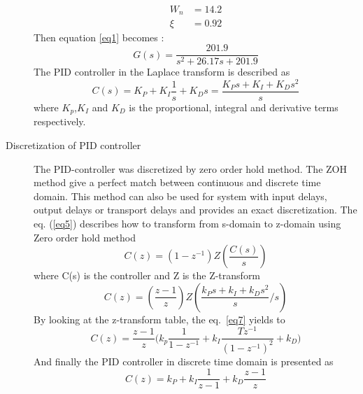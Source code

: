 \begin{description}
\begin{equation}
\begin{split}
     W_n & = 14.2 \\
    \xi & = 0.92
\end{split}
\end{equation}
Then equation \ref{eq1} becomes :
\begin{equation}
    G(s)=\frac{201.9}{s^2+26.17s+201.9}
\end{equation}
The PID controller in the Laplace transform is described as
    \begin{equation}
    C(s)= K_P+K_I \frac{1}{s}+K_Ds= \frac{K_Ps+K_I+K_Ds^2}{s}
\end{equation}
where $K_p$,$K_I$ and $K_D$ is the proportional, integral and derivative terms respectively.
\item[Discretization of PID controller]
The PID-controller was discretized by zero order hold method. The ZOH method give a perfect match between continuous and discrete time domain. This method can also be used for system with input delays, output delays or transport delays and provides an exact discretization.
The eq. (\ref{eq5}) describes how to transform from s-domain to z-domain using Zero order hold method
\begin{equation} \label{eq5}
    C(z)=(1-z^{-1}) Z(\frac{C(s)}{s})
\end{equation}
where C(s) is the controller and Z is the Z-transform
\begin{equation}
    C(z)=(\frac{z-1}{z})Z(\frac{k_Ps+k_I+k_Ds^2}{s} \Big/ s)
    \label{eq7}
\end{equation}
By looking at the z-transform table, the eq.~\eqref{eq7} yields to
\begin{equation}
    C(z)=\frac{z-1}{z}\bigg( k_p \frac{1}{1-z^{-1}}+k_I \frac{T z^{-1}}{(1-z^{-1})^2}+k_D\bigg)
\end{equation}
And finally the PID controller in discrete time domain is presented as
\begin{equation}
    C(z)= k_P + k_I \frac{1}{z-1} + k_D \frac{z-1}{z}
\end{equation}


\end{description}
